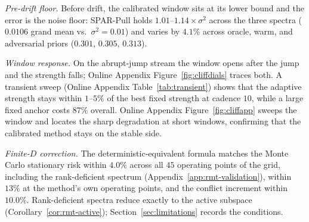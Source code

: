 \documentclass[twoside,11pt]{article}
\begin{document}
\emph{Pre-drift floor.}
Before drift, the calibrated window sits at its lower bound and the error is the noise floor: SPAR-Pull holds $1.01$--$1.14\times\sigma^2$ across the three spectra ($0.0106$ grand mean vs.\ $\sigma^2=0.01$) and varies by $4.1\%$ across oracle, warm, and adversarial priors ($0.301$, $0.305$, $0.313$).

\emph{Window response.}
On the abrupt-jump stream the window opens after the jump and the strength falls; Online Appendix Figure~\ref{fig:cliffdials} traces both.
A transient sweep (Online Appendix Table~\ref{tab:transient}) shows that the adaptive strength stays within $1$--$5\%$ of the best fixed strength at cadence $10$, while a large fixed anchor costs $87\%$ overall.
Online Appendix Figure~\ref{fig:cliffapp} sweeps the window and locates the sharp degradation at short windows, confirming that the calibrated method stays on the stable side.

\emph{Finite-$D$ correction.}
The deterministic-equivalent formula matches the Monte Carlo stationary risk within $4.0\%$ across all $45$ operating points of the grid, including the rank-deficient spectrum (Appendix~\ref{app:rmt-validation}), within $13\%$ at the method's own operating points, and the conflict increment within $10.0\%$.
Rank-deficient spectra reduce exactly to the active subspace (Corollary~\ref{cor:rmt-active}); Section~\ref{sec:limitations} records the conditions.
\end{document}
